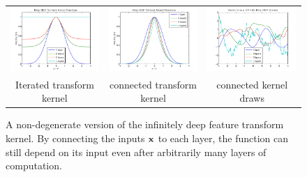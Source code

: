 \documentclass{article}
\begin{document}
\begin{figure}
\centering
\begin{tabular}{ccc}
\hspace{-0.5cm}\includegraphics[width=0.35\columnwidth, clip, trim = 0cm 0cm 0cm 0.61cm]{figures/deep_kernel} &
\hspace{-0.5cm}\includegraphics[width=0.35\columnwidth, clip, trim = 0cm 0cm 0cm 0.61cm]{figures/deep_kernel_connected} &
\hspace{-0.5cm}\includegraphics[width=0.35\columnwidth, clip, trim = 0cm 0cm 0cm 0.61cm]{figures/deep_kernel_connected_draws} \\
Iterated transform kernel & connected transform kernel & connected kernel \gp{} draws
\end{tabular}
\caption{A non-degenerate version of the infinitely deep feature transform kernel.  By connecting the inputs ${\bf{x}}$ to each layer, the function can still depend on its input even after arbitrarily many layers of computation.}
\label{fig:deep_kernel_connected}
\end{figure}
\end{document}
